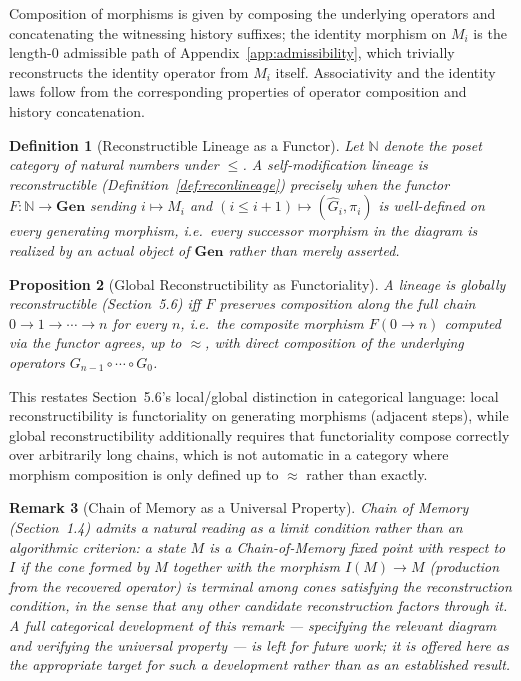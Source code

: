 \documentclass[11pt]{book}
\newtheorem{definition}{Definition}[chapter]
\newtheorem{proposition}[definition]{Proposition}
\newtheorem{remark}[definition]{Remark}
\begin{document}
Composition of morphisms is given by composing the underlying operators and concatenating the witnessing history suffixes; the identity morphism on $M_i$ is the length-$0$ admissible path of Appendix~\ref{app:admissibility}, which trivially reconstructs the identity operator from $M_i$ itself. Associativity and the identity laws follow from the corresponding properties of operator composition and history concatenation.

\begin{definition}[Reconstructible Lineage as a Functor]
Let $\mathbb{N}$ denote the poset category of natural numbers under $\le$. A self-modification lineage is \emph{reconstructible} (Definition~\ref{def:reconlineage}) precisely when the functor $F:\mathbb{N}\to\mathbf{Gen}$ sending $i\mapsto M_i$ and $(i\le i{+}1)\mapsto (\widehat{G}_i,\pi_i)$ is well-defined on every generating morphism, i.e.\ every successor morphism in the diagram is realized by an actual object of $\mathbf{Gen}$ rather than merely asserted.
\end{definition}

\begin{proposition}[Global Reconstructibility as Functoriality]
A lineage is globally reconstructible (Section~5.6) iff $F$ preserves composition along the full chain $0\to 1\to\cdots\to n$ for every $n$, i.e.\ the composite morphism $F(0\to n)$ computed via the functor agrees, up to $\approx$, with direct composition of the underlying operators $G_{n-1}\circ\cdots\circ G_0$.
\end{proposition}

This restates Section~5.6's local/global distinction in categorical language: local reconstructibility is functoriality on generating morphisms (adjacent steps), while global reconstructibility additionally requires that functoriality compose correctly over arbitrarily long chains, which is not automatic in a category where morphism composition is only defined up to $\approx$ rather than exactly.

\begin{remark}[Chain of Memory as a Universal Property]
Chain of Memory (Section~1.4) admits a natural reading as a limit condition rather than an algorithmic criterion: a state $M$ is a Chain-of-Memory fixed point with respect to $I$ if the cone formed by $M$ together with the morphism $I(M)\to M$ (production from the recovered operator) is terminal among cones satisfying the reconstruction condition, in the sense that any other candidate reconstruction factors through it. A full categorical development of this remark --- specifying the relevant diagram and verifying the universal property --- is left for future work; it is offered here as the appropriate target for such a development rather than as an established result.
\end{remark}
\end{document}
